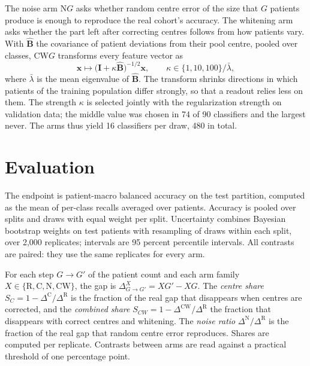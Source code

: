 \documentclass[11pt]{article}
\begin{document}
\noindent The noise arm N$G$ asks whether random centre error of the size that $G$ patients produce is enough to reproduce the real cohort's accuracy. The whitening arm asks whether the part left after correcting centres follows from how patients vary. With $\hat{\mathbf B}$ the covariance of patient deviations from their pool centre, pooled over classes, CW$G$ transforms every feature vector as
\begin{equation}
  \mathbf x\mapsto\bigl(\mathbf I+\kappa\hat{\mathbf B}\bigr)^{-1/2}\mathbf x,\qquad \kappa\in\{1,10,100\}/\bar\lambda,
  \label{eq:whiten}
\end{equation}
\noindent where $\bar\lambda$ is the mean eigenvalue of $\hat{\mathbf B}$. The transform shrinks directions in which patients of the training population differ strongly, so that a readout relies less on them. The strength $\kappa$ is selected jointly with the regularization strength on validation data; the middle value was chosen in 74 of 90 classifiers and the largest never. The arms thus yield 16 classifiers per draw, 480 in total.

\section{Evaluation}
\label{sec:evaluation}
The endpoint is patient-macro balanced accuracy on the test partition, computed as the mean of per-class recalls averaged over patients. Accuracy is pooled over splits and draws with equal weight per split. Uncertainty combines Bayesian bootstrap weights on test patients \citep{rubin1981bayesian} with resampling of draws within each split, over 2,000 replicates; intervals are 95 percent percentile intervals. All contrasts are paired: they use the same replicates for every arm.

For each step $G\to G'$ of the patient count and each arm family $X\in\{\mathrm R,\mathrm C,\mathrm N,\mathrm{CW}\}$, the gap is $\Delta^X_{G\to G'}=X G'-X G$. The \emph{centre share} $S_C=1-\Delta^{\mathrm C}/\Delta^{\mathrm R}$ is the fraction of the real gap that disappears when centres are corrected, and the \emph{combined share} $S_{CW}=1-\Delta^{\mathrm{CW}}/\Delta^{\mathrm R}$ the fraction that disappears with correct centres and whitening. The \emph{noise ratio} $\Delta^{\mathrm N}/\Delta^{\mathrm R}$ is the fraction of the real gap that random centre error reproduces. Shares are computed per replicate. Contrasts between arms are read against a practical threshold of one percentage point.
\end{document}
